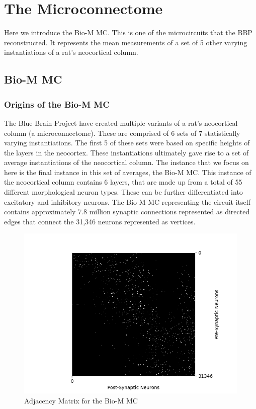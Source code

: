 \section{The Microconnectome}
Here we introduce the Bio-M MC. This is one of the microcircuits that the BBP reconstructed. It represents the mean measurements of a set of 5 other varying instantiations of a rat's neocortical column.
\subsection{Bio-M MC}
\subsubsection{Origins of the Bio-M MC}
The Blue Brain Project have created multiple variants of a rat's neocortical column (a microconnectome). These are  comprised of 6 sets of 7 statistically varying instantiations. The first 5 of these sets were based on specific heights of the layers in the neocortex. These instantiations ultimately gave rise to a set of average instantiations of the neocortical column. The instance that we focus on here is the final instance in this set of averages, the Bio-M MC. This instance of the neocortical column contains 6 layers, that are made up from a total of 55 different morphological neuron types. These can be further differentiated into excitatory and inhibitory neurons. The Bio-M MC representing the circuit itself contains approximately 7.8 million synaptic connections represented as directed edges that connect the 31,346 neurons represented as vertices.

\begin{figure}[H]
\begin{center}
\captionsetup{justification=centering}
\includegraphics[width=12cm]{BioM/matrix_BioM.png}
\caption{Adjacency Matrix for the Bio-M MC}
\end{center}
\end{figure}
